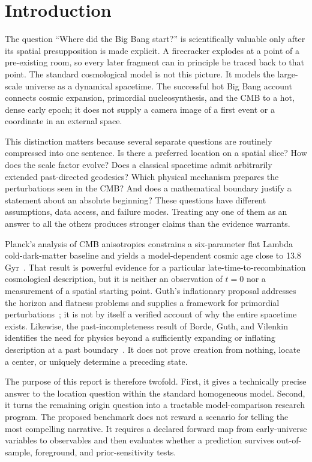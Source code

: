 \documentclass[10pt,conference]{IEEEtran}
\begin{document}
\section{Introduction}
\label{sec:introduction}

The question ``Where did the Big Bang start?'' is scientifically valuable only after its spatial presupposition is made explicit. A firecracker explodes at a point of a pre-existing room, so every later fragment can in principle be traced back to that point. The standard cosmological model is not this picture. It models the large-scale universe as a dynamical spacetime. The successful hot Big Bang account connects cosmic expansion, primordial nucleosynthesis, and the CMB to a hot, dense early epoch; it does not supply a camera image of a first event or a coordinate in an external space.

This distinction matters because several separate questions are routinely compressed into one sentence. Is there a preferred location on a spatial slice? How does the scale factor evolve? Does a classical spacetime admit arbitrarily extended past-directed geodesics? Which physical mechanism prepares the perturbations seen in the CMB? And does a mathematical boundary justify a statement about an absolute beginning? These questions have different assumptions, data access, and failure modes. Treating any one of them as an answer to all the others produces stronger claims than the evidence warrants.

Planck's analysis of CMB anisotropies constrains a six-parameter flat Lambda cold-dark-matter baseline and yields a model-dependent cosmic age close to 13.8 Gyr~\cite{planck2020}. That result is powerful evidence for a particular late-time-to-recombination cosmological description, but it is neither an observation of $t=0$ nor a measurement of a spatial starting point. Guth's inflationary proposal addresses the horizon and flatness problems and supplies a framework for primordial perturbations~\cite{guth1981}; it is not by itself a verified account of why the entire spacetime exists. Likewise, the past-incompleteness result of Borde, Guth, and Vilenkin identifies the need for physics beyond a sufficiently expanding or inflating description at a past boundary~\cite{bgv2003}. It does not prove creation from nothing, locate a center, or uniquely determine a preceding state.

The purpose of this report is therefore twofold. First, it gives a technically precise answer to the location question within the standard homogeneous model. Second, it turns the remaining origin question into a tractable model-comparison research program. The proposed benchmark does not reward a scenario for telling the most compelling narrative. It requires a declared forward map from early-universe variables to observables and then evaluates whether a prediction survives out-of-sample, foreground, and prior-sensitivity tests.
\end{document}
